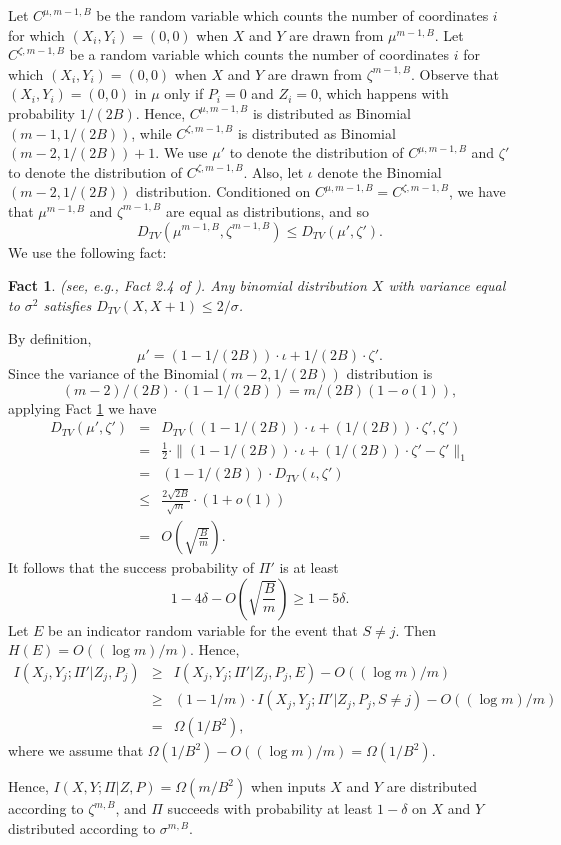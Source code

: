 \documentclass[twoside,leqno,twocolumn]{article}
\newtheorem{fact}[theorem]{Fact}
\begin{document}
Let $C^{\mu, m-1, B}$ be the random variable which counts the number of 
coordinates $i$ for which $(X_i, Y_i) = (0,0)$ when $X$ and $Y$ are 
drawn from $\mu^{m-1,B}$. Let $C^{\zeta, m-1, B}$ be a random
variable which counts the number of coordinates $i$ for which
$(X_i, Y_i) = (0,0)$ when $X$ and $Y$ are drawn from $\zeta^{m-1, B}$. 
Observe that $(X_i, Y_i) = (0,0)$ in $\mu$ only if $P_i = 0$ and $Z_i = 0$, which happens
with probability $1/(2B)$. Hence,
$C^{\mu, m-1, B}$ is distributed as Binomial$(m-1, 1/(2B))$, while
$C^{\zeta, m-1, B}$ is distributed as Binomial$(m-2, 1/(2B)) + 1$. We use
$\mu'$ to denote the distribution of $C^{\mu, m-1, B}$ and $\zeta'$ to denote
the distribution of $C^{\zeta, m-1, B}$. Also, let $\iota$ denote the 
Binomial$(m-2, 1/(2B))$ distribution. 
Conditioned on $C^{\mu, m-1, B} = C^{\zeta, m-1, B}$, we have that $\mu^{m-1,B}$ and $\zeta^{m-1,B}$ are
equal as distributions, and so 
$$D_{TV}(\mu^{m-1,B}, \zeta^{m-1,B}) \leq D_{TV}(\mu', \zeta').$$
We use the following fact:
\begin{fact}\label{fact:vd} (see, e.g., Fact 2.4 of \cite{gmrz11}). 
Any binomial distribution $X$ with variance equal to $\sigma^2$ 
satisfies $D_{TV}(X, X+1) \leq 2/\sigma$. 
\end{fact}
By definition, $$\mu' = (1-1/(2B)) \cdot \iota + 1/(2B) \cdot \zeta'.$$
Since the variance of the Binomial$(m-2, 1/(2B))$ distribution is 
$$(m-2)/(2B) \cdot (1-1/(2B)) = m/(2B) (1-o(1)),$$ applying
Fact \ref{fact:vd} we have
\begin{eqnarray*}
D_{TV}(\mu', \zeta')
& = & D_{TV}((1-1/(2B)) \cdot \iota + (1/(2B)) \cdot \zeta', \zeta')\\
& = & \frac{1}{2} \cdot \|(1-1/(2B)) \cdot \iota + (1/(2B)) \cdot \zeta' - \zeta'\|_1\\
& = & (1-1/(2B)) \cdot D_{TV}(\iota, \zeta')\\
& \leq & \frac{2\sqrt{2B}}{\sqrt{m}} \cdot (1+o(1))\\
& = & O \left (\sqrt{\frac{B}{m}} \right ). 
\end{eqnarray*}
It follows that the success probability of $\Pi'$ is at least 
$$1-4\delta-O \left (\sqrt{\frac{B}{m}} \right ) \geq 1-5\delta.$$
Let $E$ be an indicator random variable for the event that $S \neq j$. Then
$H(E) = O((\log m) / m)$. Hence,
\begin{eqnarray*}
I(X_j, Y_j ; \Pi' | Z_j, P_j) & \geq & I(X_j, Y_j ; \Pi' | Z_j, P_j, E) - O((\log m) / m)\\
& \geq & (1-1/m) \cdot I(X_j, Y_j ; \Pi' | Z_j, P_j, S \neq j)
- O((\log m) / m)\\
& = & \Omega(1/B^2), 
\end{eqnarray*}
where we assume that $\Omega(1/B^2) - O((\log m) / m) = \Omega(1/B^2).$

Hence, $I(X, Y ; \Pi | Z, P) = \Omega(m/B^2)$ when inputs
$X$ and $Y$ are distributed according to $\zeta^{m,B}$, and $\Pi$ succeeds
with probability at least $1-\delta$ on $X$ and $Y$ distributed
according to $\sigma^{m,B}$. 
\end{document}
